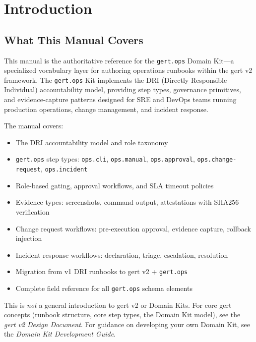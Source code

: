 \chapter{Introduction}
\label{ch:introduction}

\section{What This Manual Covers}

This manual is the authoritative reference for the \texttt{gert.ops} Domain Kit---a specialized vocabulary layer for authoring operations runbooks within the gert v2 framework. The \texttt{gert.ops} Kit implements the DRI (Directly Responsible Individual) accountability model, providing step types, governance primitives, and evidence-capture patterns designed for SRE and DevOps teams running production operations, change management, and incident response.

The manual covers:

\begin{itemize}
  \item The DRI accountability model and role taxonomy
  \item \texttt{gert.ops} step types: \texttt{ops.cli}, \texttt{ops.manual}, \texttt{ops.approval}, \texttt{ops.change-request}, \texttt{ops.incident}
  \item Role-based gating, approval workflows, and SLA timeout policies
  \item Evidence types: screenshots, command output, attestations with SHA256 verification
  \item Change request workflows: pre-execution approval, evidence capture, rollback injection
  \item Incident response workflows: declaration, triage, escalation, resolution
  \item Migration from v1 DRI runbooks to gert v2 + \texttt{gert.ops}
  \item Complete field reference for all \texttt{gert.ops} schema elements
\end{itemize}

This is \emph{not} a general introduction to gert v2 or Domain Kits. For core gert concepts (runbook structure, core step types, the Domain Kit model), see the \emph{gert v2 Design Document}. For guidance on developing your own Domain Kit, see the \emph{Domain Kit Development Guide}.

